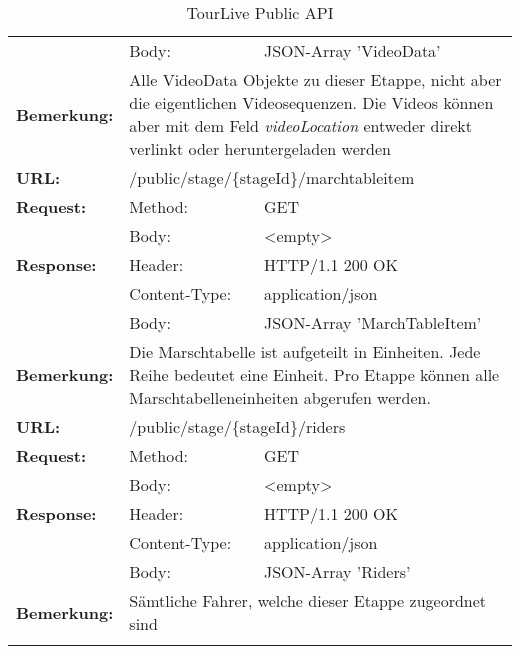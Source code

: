 {\begin{longtable}{ p{2.5cm} p{3.5cm} p{6cm}}
		& Body: & JSON-Array 'VideoData'\\
	\textbf{Bemerkung:} & \multicolumn{2}{p{10cm}}{Alle VideoData Objekte zu dieser Etappe, nicht aber die eigentlichen Videosequenzen. Die Videos können aber mit dem Feld \textit{videoLocation} entweder direkt verlinkt oder heruntergeladen werden} \\
\hline
\hline
	\textbf{URL:} & \multicolumn{2}{l}{/public/stage/\{stageId\}/marchtableitem} \\
	\textbf{Request:} & Method: & GET \\
		& Body: & <empty>\\
	\textbf{Response:} &  Header: & HTTP/1.1 200 OK \\
		& Content-Type: & application/json \\
		& Body: & JSON-Array 'MarchTableItem'\\
	\textbf{Bemerkung:} & \multicolumn{2}{p{10cm}}{Die Marschtabelle ist aufgeteilt in Einheiten. Jede Reihe bedeutet eine Einheit. Pro Etappe können alle Marschtabelleneinheiten abgerufen werden.} \\
\hline
\hline
	\textbf{URL:} & \multicolumn{2}{l}{/public/stage/\{stageId\}/riders} \\
	\textbf{Request:} & Method: & GET \\
		& Body: & <empty>\\
	\textbf{Response:} &  Header: & HTTP/1.1 200 OK \\
		& Content-Type: & application/json \\
		& Body: & JSON-Array 'Riders'\\
	\textbf{Bemerkung:} & \multicolumn{2}{p{10cm}}{Sämtliche Fahrer, welche dieser Etappe zugeordnet sind} \\
\hline
\hline
\caption{TourLive Public API}
\end{longtable}}

